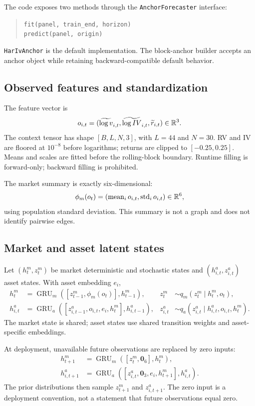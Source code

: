 \documentclass[11pt]{article}
\begin{document}
The code exposes two methods through the \texttt{AnchorForecaster} interface:
\begin{quote}\small
\texttt{fit(panel, train\_end, horizon)}\\
\texttt{predict(panel, origin)}
\end{quote}
\texttt{HarIvAnchor} is the default implementation. The block-anchor builder accepts an anchor object while retaining backward-compatible default behavior.

\subsection{Observed features and standardization}
The feature vector is
\begin{equation}o_{i,t}=(\widetilde{\log v}_{i,t},\widetilde{\log IV}_{i,t},\widetilde r_{i,t})\in\mathbb R^3.\end{equation}
The context tensor has shape $[B,L,N,3]$, with $L=44$ and $N=30$. RV and IV are floored at $10^{-8}$ before logarithms; returns are clipped to $[-0.25,0.25]$. Means and scales are fitted before the rolling-block boundary. Runtime filling is forward-only; backward filling is prohibited.

The market summary is exactly six-dimensional:
\begin{equation}\phi_m(o_t)=\left(\operatorname{mean}_i o_{i,t},\operatorname{std}_i o_{i,t}\right)\in\mathbb R^6,\end{equation}
using population standard deviation. This summary is not a graph and does not identify pairwise edges.

\subsection{Market and asset latent states}
Let $(h_t^m,z_t^m)$ be market deterministic and stochastic states and $(h_{i,t}^a,z_{i,t}^a)$ asset states. With asset embedding $e_i$,
\begin{align}h_t^m&=\operatorname{GRU}_m([z_{t-1}^m,\phi_m(o_t)],h_{t-1}^m),&z_t^m&\sim q_m(z_t^m\mid h_t^m,o_t),\\h_{i,t}^a&=\operatorname{GRU}_a([z_{i,t-1}^a,o_{i,t},e_i,h_t^m],h_{i,t-1}^a),&z_{i,t}^a&\sim q_a(z_{i,t}^a\mid h_{i,t}^a,o_{i,t},h_t^m).
\end{align}
The market state is shared; asset states use shared transition weights and asset-specific embeddings.

At deployment, unavailable future observations are replaced by zero inputs:
\begin{align}h_{t+1}^m&=\operatorname{GRU}_m([z_t^m,\mathbf0_6],h_t^m),\\h_{i,t+1}^a&=\operatorname{GRU}_a([z_{i,t}^a,\mathbf0_3,e_i,h_{t+1}^m],h_{i,t}^a).
\end{align}
The prior distributions then sample $z_{t+1}^m$ and $z_{i,t+1}^a$. The zero input is a deployment convention, not a statement that future observations equal zero.
\end{document}
